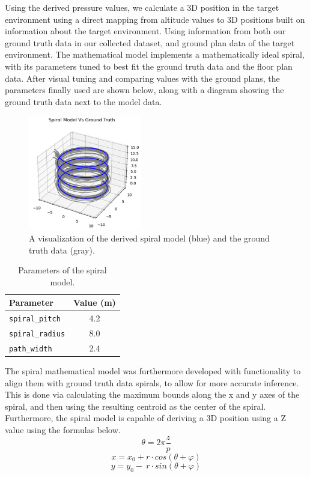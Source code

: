 Using the derived pressure values, we calculate a 3D position in the target environment using a direct mapping from altitude values to 3D positions built on information about the target environment. Using information from both our ground truth data in our collected dataset, and ground plan data of the target environment. The mathematical model implements a mathematically ideal spiral, with its parameters tuned to best fit the ground truth data and the floor plan data. After visual tuning and comparing values with the ground plans, the parameters finally used are shown below, along with a diagram showing the ground truth data next to the model data.

\begin{figure}[h] 
	\centering \includegraphics[height=5cm]{./images/spiralmodel.png}
	\caption{A visualization of the derived spiral model (blue) and the ground truth data (gray).}
\end{figure}

\begin{table}[h!]
\centering
\renewcommand{\arraystretch}{0.9} %
\setlength{\tabcolsep}{6pt}       %
\begin{tabular}{|l|c|}
\hline
\textbf{Parameter}       & \textbf{Value (m)} \\ \hline
\texttt{spiral\_pitch}   & 4.2               \\ \hline
\texttt{spiral\_radius}  & 8.0               \\ \hline
\texttt{path\_width}     & 2.4               \\ \hline
\end{tabular}
\vspace{-0.5em}
\caption{Parameters of the spiral model.}
\label{tab:spiral_params}
\end{table}
\par

The spiral mathematical model was furthermore developed with functionality to align them with ground truth data spirals, to allow for more accurate inference. This is done via calculating the maximum bounds along the x and y axes of the spiral, and then using the resulting centroid as the center of the spiral. Furthermore, the spiral model is capable of deriving a 3D position using a Z value using the formulas below.
$$\theta=2\pi\frac{z}{p}$$
$$x=x_0+r\cdot cos\left(\theta+\varphi\right)$$
$$y=y_0-\ r\cdot sin\left(\theta+\varphi\right)$$ 

